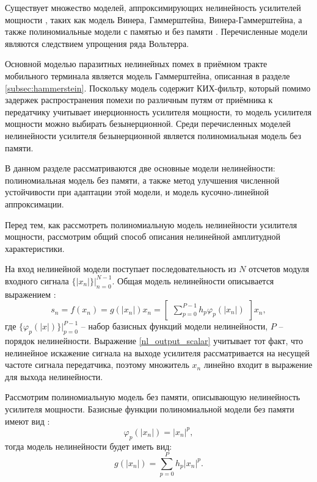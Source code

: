 Существует множество моделей, аппроксимирующих нелинейность усилителей мощности \cite{pa_models}, таких как модель Винера, Гаммерштейна, Винера-Гаммерштейна, а также полиномиальные модели с памятью и без памяти \cite{dpd_models}. Перечисленные модели являются следствием упрощения ряда Вольтерра. 

Основной моделью паразитных нелинейных помех в приёмном тракте мобильного терминала является модель Гаммерштейна, описанная в разделе \ref{subsec:hammerstein}. Поскольку модель содержит КИХ-фильтр, который помимо задержек распространения помехи по различным путям от приёмника к передатчику учитывает инерционность усилителя мощности, то модель усилителя мощности можно выбирать безынерционной. Среди перечисленных моделей нелинейности усилителя безынерционной является полиномиальная модель без памяти.

В данном разделе рассматриваются две основные модели нелинейности: полиномиальная модель без памяти, а также метод улучшения численной устойчивости при адаптации этой модели, и модель кусочно-линейной аппроксимации.

Перед тем, как рассмотреть полиномиальную модель нелинейности усилителя мощности, рассмотрим общий способ описания нелинейной амплитудной характеристики. 

На вход нелинейной модели поступает последовательность из $N$ отсчетов модуля входного сигнала $\{|x_n|\}|_{n=0}^{N-1}$. Общая модель нелинейности описывается выражением \cite{dpd_models}:
\begin{equation}
	s_n=f(x_n)=g(|x_n|)x_n=\begin{bmatrix}
		\displaystyle\sum_{p=0}^{P-1}h_p\varphi_p(|x_n|)
	\end{bmatrix}x_n,
	\label{nl_output_scalar}
\end{equation}
где $\{\varphi_p(|x|)\}|_{p=0}^{P-1}$ -- набор базисных функций модели нелинейности, $P$ -- порядок нелинейности. Выражение \eqref{nl_output_scalar} учитывает тот факт, что нелинейное искажение сигнала на выходе усилителя рассматривается на несущей частоте сигнала передатчика, поэтому множитель $x_n$ линейно входит в выражение для выхода нелинейности.

Рассмотрим полиномиальную модель без памяти, описывающую нелинейность усилителя мощности. Базисные функции полиномиальной модели без памяти имеют вид \cite{dpd_models}:
\begin{equation}
	\varphi_p(|x_n|)=|x_n|^p,
	\label{basis_polynom_no_mem}
\end{equation}
тогда модель нелинейности будет иметь вид:
\begin{equation}
	g(|x_n|)=\displaystyle\sum_{p=0}^{P}h_p|x_n|^p.
	\label{nonlin_pa_out_polinom}
\end{equation}

